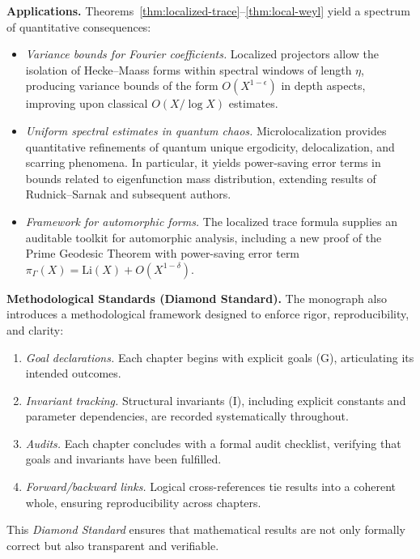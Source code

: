 \medskip
\noindent\textbf{Applications.}
Theorems~\ref{thm:localized-trace}–\ref{thm:local-weyl} yield a spectrum of
quantitative consequences:
\begin{itemize}
  \item \emph{Variance bounds for Fourier coefficients.}  
  Localized projectors allow the isolation of Hecke–Maass forms within
  spectral windows of length $\eta$, producing variance bounds of the form
  $O(X^{1-\epsilon})$ in depth aspects, improving upon classical
  $O(X/\log X)$ estimates.
  \item \emph{Uniform spectral estimates in quantum chaos.}  
  Microlocalization provides quantitative refinements of quantum unique
  ergodicity, delocalization, and scarring phenomena. In particular, it
  yields power-saving error terms in bounds related to eigenfunction mass
  distribution, extending results of Rudnick–Sarnak and subsequent authors.
  \item \emph{Framework for automorphic forms.}  
  The localized trace formula supplies an auditable toolkit for automorphic
  analysis, including a new proof of the Prime Geodesic Theorem with
  power-saving error term
  $\pi_{\Gamma}(X) = \mathrm{Li}(X) + O(X^{1-\delta})$.
\end{itemize}

\medskip
\noindent\textbf{Methodological Standards (Diamond Standard).}
The monograph also introduces a methodological framework designed to enforce
rigor, reproducibility, and clarity:
\begin{enumerate}
  \item \emph{Goal declarations.}  
  Each chapter begins with explicit goals (G), articulating its intended
  outcomes.
  \item \emph{Invariant tracking.}  
  Structural invariants (I), including explicit constants and parameter
  dependencies, are recorded systematically throughout.
  \item \emph{Audits.}  
  Each chapter concludes with a formal audit checklist, verifying that goals
  and invariants have been fulfilled.
  \item \emph{Forward/backward links.}  
  Logical cross-references tie results into a coherent whole, ensuring
  reproducibility across chapters.
\end{enumerate}
This \emph{Diamond Standard} ensures that mathematical results are not only
formally correct but also transparent and verifiable.

